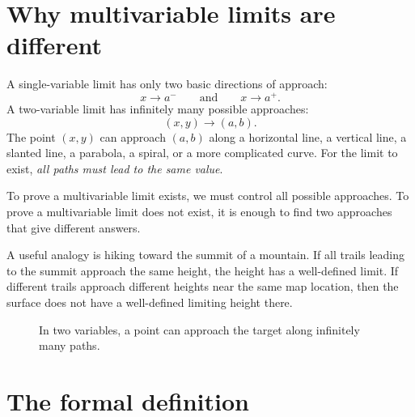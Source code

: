 \documentclass[11pt]{article}
\begin{document}
\section{Why multivariable limits are different}

A single-variable limit has only two basic directions of approach:
\[
x\to a^- \qquad \text{and} \qquad x\to a^+.
\]
A two-variable limit has infinitely many possible approaches:
\[
(x,y)\to(a,b).
\]
The point $(x,y)$ can approach $(a,b)$ along a horizontal line, a vertical line, a slanted line, a parabola, a spiral, or a more complicated curve. For the limit to exist, \emph{all paths must lead to the same value}.

\begin{importantbox}
To prove a multivariable limit exists, we must control all possible approaches. To prove a multivariable limit does not exist, it is enough to find two approaches that give different answers.
\end{importantbox}

A useful analogy is hiking toward the summit of a mountain. If all trails leading to the summit approach the same height, the height has a well-defined limit. If different trails approach different heights near the same map location, then the surface does not have a well-defined limiting height there.

\begin{figure}[H]
\centering
{}
\caption{In two variables, a point can approach the target along infinitely many paths.}
\end{figure}

\section{The formal definition}
\end{document}
